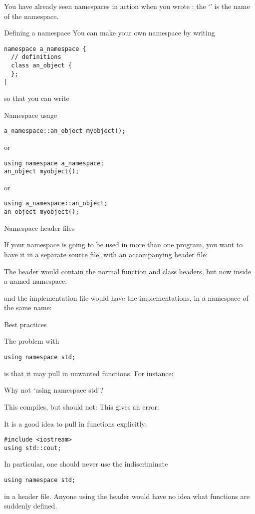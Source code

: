 You have already seen namespaces in action when you wrote
: the `' is the name of the namespace.

\begin{block}{Defining a namespace}
  \label{sl:namespace-def}
  You can make your own namespace by writing
\begin{verbatim}
namespace a_namespace {
  // definitions
  class an_object { 
  };
|
\end{verbatim}
\end{block}

so that you can write
\begin{block}{Namespace usage}
  \label{sl:namespace-use}
\begin{verbatim}
a_namespace::an_object myobject();
\end{verbatim}
or
\begin{verbatim}
using namespace a_namespace;
an_object myobject();
\end{verbatim}
or
\begin{verbatim}
using a_namespace::an_object;
an_object myobject();
\end{verbatim}
\end{block}

 {Namespace header files}

If your namespace is going to be used in more than one program, you
want to have it in a separate source file, with an accompanying header
file:
%

The header would contain the normal function and class headers, but
now inside a named namespace:
%

and the implementation file would have the implementations, in a
namespace of the same name:
%

 {Best practices}

The problem with
\begin{verbatim}
using namespace std;
\end{verbatim}
is that it may pull in unwanted functions. For instance:

\begin{block}{Why not `using namespace std'?}
  \label{sl:namespace-std-harm}
  \begin{multicols}{2}
    This compiles, but should not:
    \vfill\columnbreak
    This gives an error:
  \end{multicols}
\end{block}

It is a good idea to pull in functions explicitly:
\begin{verbatim}
#include <iostream>
using std::cout;
\end{verbatim}

In particular, one should never use the indiscriminate
\begin{verbatim}
using namespace std;
\end{verbatim}
in a header file. Anyone using the header would have no idea what
functions are suddenly defined.
